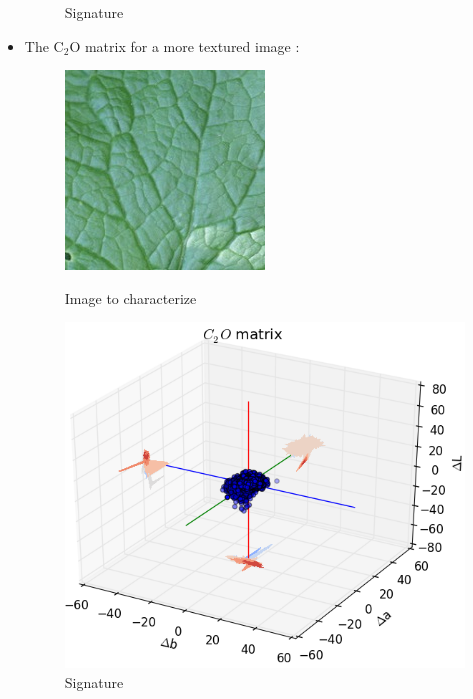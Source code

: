 \documentclass[xcolor=table]{beamer}
\begin{document}
\begin{frame}
\begin{itemize}
{\begin{figure}[htbp]
\begin{minipage}[c]{.55\linewidth}
\begin{center}
    \caption{Signature}
    \label{fig:Sig}
      \end{center}
    \end{minipage}
\end{figure}}
\item<2-> The C$_2$O matrix for a more textured image :
 {\begin{figure}[htbp]
    \begin{minipage}[c]{.40\linewidth}
      \begin{center}
    \includegraphics[scale=0.70]{119p.jpg}
    \caption{Image to characterize}
    \label{fig:Sig}
      \end{center}
    \end{minipage}
    \hfill
    \begin{minipage}[c]{.55\linewidth}
      \begin{center}
    \includegraphics[scale=0.38]{C2OMat119p.png}
    \caption{Signature}
    \label{fig:Sig}
      \end{center}

\end{minipage}
\end{figure}}
\end{itemize}
\end{frame}
\end{document}
